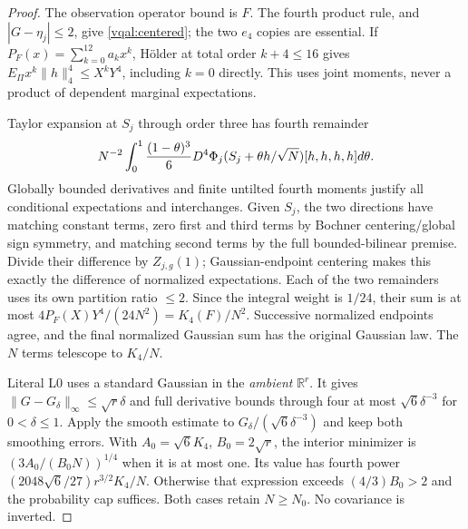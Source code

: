 \documentclass[11pt]{article}
\theoremstyle{plain}
\theoremstyle{definition}
\theoremstyle{remark}
\newcommand{\R}{\mathbb{R}}
\begin{document}
\begin{proof}
The observation operator bound is $F$. The fourth product rule, and
$|G-\eta_j|\le2$, give \eqref{vqal:centered}; the two $e_4$ copies
are essential. If $P_F(x)=\sum_{k=0}^{12}a_kx^k$, H\"older at total
order $k+4\le16$ gives $E_\Pi x^k\|h\|_4^4\le X^kY^4$,
including $k=0$ directly. This uses joint moments, never a product of
dependent marginal expectations.

Taylor expansion at $S_j$ through order three has fourth remainder
\begin{equation}\label{vqal:taylor}
 N^{-2}\int_0^1{(1-\theta)^3\over6}
 D^4\Phi_j(S_j+\theta h/\sqrt N)[h,h,h,h]d\theta.
\end{equation}
Globally bounded derivatives and finite untilted fourth moments justify
all conditional expectations and interchanges. Given $S_j$, the two
directions have matching constant terms, zero first and third terms by
Bochner centering/global sign symmetry, and matching second terms by
the full bounded-bilinear premise. Divide their difference by
$Z_{j,g}(1)$; Gaussian-endpoint centering makes this exactly the
difference of normalized expectations. Each of the two remainders uses
its own partition ratio $\le2$. Since the integral weight is $1/24$,
their sum is at most $4P_F(X)Y^4/(24N^2)=K_4(F)/N^2$.
Successive normalized endpoints agree, and the final normalized Gaussian
sum has the original Gaussian law. The $N$ terms telescope to $K_4/N$.

Literal L0 uses a standard Gaussian in the \emph{ambient} $\R^r$.
It gives $\|G-G_\delta\|_\infty\le\sqrt r\delta$ and full derivative
bounds through four at most $\sqrt6\delta^{-3}$ for $0<\delta\le1$.
Apply the smooth estimate to $G_\delta/(\sqrt6\delta^{-3})$ and keep
both smoothing errors. With $A_0=\sqrt6K_4$, $B_0=2\sqrt r$, the
interior minimizer is $(3A_0/(B_0N))^{1/4}$ when it is at most one.
Its value has fourth power $(2048\sqrt6/27)r^{3/2}K_4/N$.
Otherwise that expression exceeds $(4/3)B_0>2$ and the probability cap
suffices. Both cases retain $N\ge N_0$. No covariance is inverted.
\end{proof}
\end{document}
